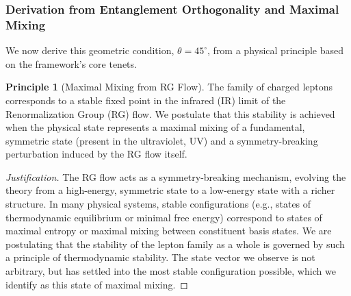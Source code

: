 \documentclass[11pt, letterpaper]{report}
\theoremstyle{plain} %
\theoremstyle{definition} %
\newtheorem{principle}{Principle}[chapter]
\theoremstyle{remark} %
\begin{document}
\subsubsection{Derivation from Entanglement Orthogonality and Maximal Mixing}

We now derive this geometric condition, $\theta=45^\circ$, from a physical principle based on the framework's core tenets.

\begin{principle}[Maximal Mixing from RG Flow]
\label{principle:maximal_mixing}
The family of charged leptons corresponds to a stable fixed point in the infrared (IR) limit of the Renormalization Group (RG) flow. We postulate that this stability is achieved when the physical state represents a maximal mixing of a fundamental, symmetric state (present in the ultraviolet, UV) and a symmetry-breaking perturbation induced by the RG flow itself.
\end{principle}
\begin{proof}[Justification]
The RG flow acts as a symmetry-breaking mechanism, evolving the theory from a high-energy, symmetric state to a low-energy state with a richer structure. In many physical systems, stable configurations (e.g., states of thermodynamic equilibrium or minimal free energy) correspond to states of maximal entropy or maximal mixing between constituent basis states. We are postulating that the stability of the lepton family as a whole is governed by such a principle of thermodynamic stability. The state vector we observe is not arbitrary, but has settled into the most stable configuration possible, which we identify as this state of maximal mixing.
\end{proof} %
\end{document}
